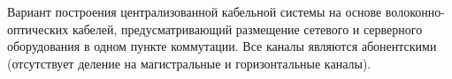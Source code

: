 Вариант построения централизованной кабельной
системы на основе волоконно-оптических кабелей,
предусматривающий размещение сетевого и серверного
оборудования в одном пункте коммутации. Все каналы 
являются абонентскими (отсутствует деление на магистральные
и горизонтальные каналы).